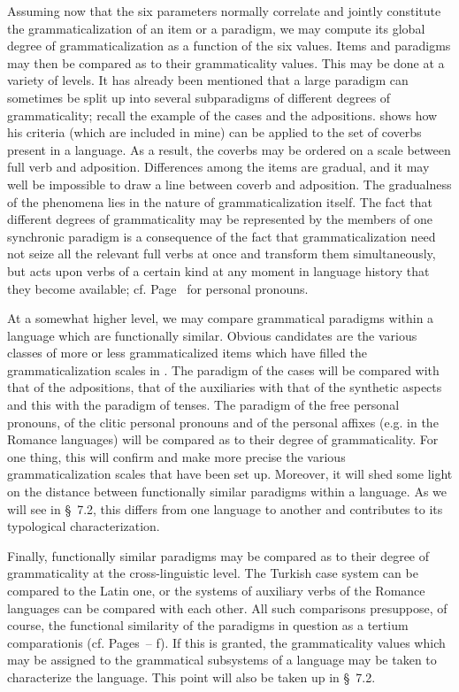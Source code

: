 Assuming now that the six parameters normally correlate and jointly constitute the grammaticalization of an item or a paradigm, we may compute its global degree of grammaticalization as a function of the six values. Items and paradigms may then be compared as to their grammaticality values. This may be done at a variety of levels. It has already been mentioned that a large paradigm can sometimes be split up into several subparadigms of different degrees of grammaticality; recall the example of the cases and the adpositions. \citet[86]{Givón1975} shows how his criteria (which are included in mine) can be applied to the set of coverbs present in a language. As a result, the coverbs may be ordered on a scale between full verb and adposition. Differences among the items are gradual, and it may well be impossible to draw a line between coverb and adposition. The gradualness of the phenomena lies in the nature of grammaticalization itself. The fact that different degrees of grammaticality may be represented by the members of one synchronic paradigm is a consequence of the fact that grammaticalization need not seize all the relevant full verbs at once and transform them simultaneously, but acts upon verbs of a certain kind at any moment in language history that they become available; cf. Page~\pageref{page43}\chk%
 for personal pronouns.

At a somewhat higher level, we may compare grammatical paradigms within a language which are functionally similar. Obvious candidates are the various classes of more or less grammaticalized items which have filled the grammaticalization scales in . The paradigm of the cases will be compared with that of the adpositions, that of the auxiliaries with that of the synthetic aspects and this with the paradigm of tenses. The paradigm of the free personal pronouns, of the clitic personal pronouns and of the personal affixes (e.g. in the Romance languages) will be compared as to their degree of grammaticality. For one thing, this will confirm and make more precise the various grammaticalization scales that have been set up. Moreover, it will shed some light on the distance between functionally similar paradigms within a language. As we will see in §~7.2, this differs from one language to another and contributes to its typological characterization.

Finally, functionally similar paradigms may be compared as to their degree of grammaticality at the cross-linguistic level. The Turkish case system can be compared to the Latin one, or the systems of auxiliary verbs of the Romance languages can be compared with each other. All such comparisons presuppose, of course, the functional similarity of the paradigms in question as a tertium comparationis (cf. Pages~\pageref{page135}--\pageref{page135b}\chk%
f). If this is granted, the grammaticality values which may be assigned to the grammatical subsystems of a language may be taken to characterize the language. This point will also be taken up in §~7.2.

